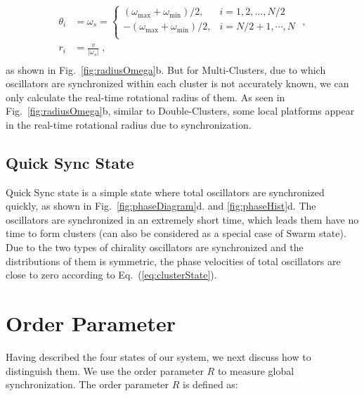 \documentclass[%
 aip,
 amsmath,amssymb,
 reprint,%
]{revtex4-1}
\begin{document}
\begin{equation}
    \begin{aligned}\label{eq:clusterState2}
        \theta _i&=\omega _s=\begin{cases}
        \left( \omega _{\max}+\omega _{\min} \right) /2,&		i=1,2,\dots ,N/2\\
        -\left( \omega _{\max}+\omega _{\min} \right) /2,&		i=N/2+1,\cdots ,N\\
    \end{cases}\,\,,\\
        r_i&=\frac{v}{\left|\omega _s\right|}\;,\\
    \end{aligned}
\end{equation}
as shown in Fig.~\ref{fig:radiusOmega}b. But for Multi-Clusters, due to which oscillators are synchronized within each cluster is not accurately known, we can only calculate the real-time rotational radius of them. As seen in Fig.~\ref{fig:radiusOmega}b, similar to Double-Clusters, some local platforms appear in the real-time rotational radius due to synchronization.

\subsection{Quick Sync State}

Quick Sync state is a simple state where total oscillators are synchronized quickly, as shown in Fig.~\ref{fig:phaseDiagram}d. and \ref{fig:phaseHist}d. The oscillators are synchronized in an extremely short time, which leads them have no time to form clusters (can also be considered as a special case of Swarm state). Due to the two types of chirality oscillators are synchronized and the distributions of them is symmetric, the phase velocities of total oscillators are close to zero according to Eq.~(\ref{eq:clusterState}).

\section{\label{sec:orderParam}Order Parameter}

Having described the four states of our system, we next discuss how to distinguish them. We use the order parameter $R$ to measure global synchronization. The order parameter $R$ is defined as:
\end{document}
